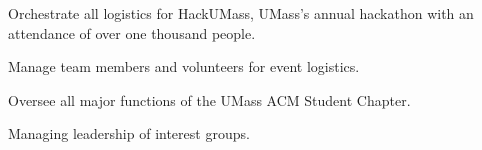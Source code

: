 
\begin{tightemize}
  \item Orchestrate all logistics for HackUMass, UMass's annual hackathon with
    an attendance of over one thousand people.
  \item Manage team members and volunteers for event logistics.
\end{tightemize}
\subsectionsep

\begin{tightemize}
  \item Oversee all major functions of the UMass ACM Student Chapter.
  \item Managing leadership of interest groups.
\end{tightemize}

